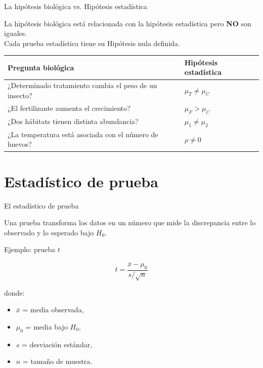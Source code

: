 \documentclass[11pt, aspectratio=169]{beamer}
\begin{document}
\begin{frame}
{La hipótesis biológica vs. Hipótesis estadística}

\centering

La hipótesis biológica está relacionada con la hipótesis estadística pero
\textbf{NO} son iguales.\\
Cada prueba estadística tiene su Hipótesis nula
definida.

\pause

\begin{center}
\begin{tabular}{p{} p{}}
\toprule
\textbf{Pregunta biológica} & \textbf{Hipótesis estadística}\\
\midrule
¿Determinado tratamiento cambia el peso de un insecto? &
$\mu_T \neq \mu_C$\\[0.2cm]

¿El fertilizante aumenta el crecimiento? &
$\mu_F > \mu_C$\\[0.2cm]

¿Dos hábitats tienen distinta abundancia? &
$\mu_1 \neq \mu_2$\\[0.2cm]

¿La temperatura está asociada con el número de huevos? &
$\rho \neq 0$\\
\bottomrule
\end{tabular}
\end{center}

\end{frame}

\section{Estadístico de prueba}

\begin{frame}{El estadístico de prueba}

Una prueba transforma los datos en un número que mide la discrepancia
entre lo observado y lo esperado bajo $H_0$.

Ejemplo: prueba $t$

\[
t=
\frac{\bar{x}-\mu_0}
{s/\sqrt{n}}
\]

donde:

\begin{itemize}
    \item $\bar{x}$ = media observada,
    \item $\mu_0$ = media bajo $H_0$,
    \item $s$ = desviación estándar,
    \item $n$ = tamaño de muestra.
\end{itemize}

\end{frame}
\end{document}
